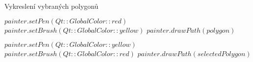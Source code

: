 \begin{algorithm}
    \caption{Vykreslení vybraných polygonů}
    \begin{algorithmic}[1]

            \STATE $painter.setPen(Qt::GlobalColor::red)$
            \STATE $painter.setBrush(Qt::GlobalColor::yellow)$
            \STATE $painter.drawPath(polygon)$
        \ENDFOR

            \STATE $painter.setPen(Qt::GlobalColor::yellow)$
            \STATE $painter.setBrush(Qt::GlobalColor::red)$
            \STATE $painter.drawPath(selectedPolygon)$
        \ENDFOR

        
    \end{algorithmic}
\end{algorithm}
